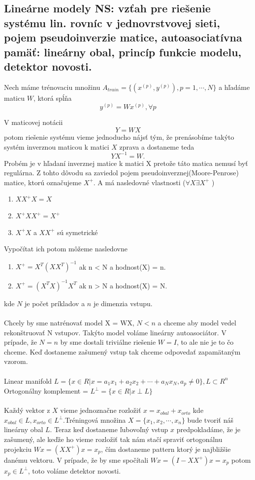 \documentclass{article}
\numberwithin{equation}{section} %
\begin{document}
\subsection{Lineárne modely NS: vzťah pre riešenie systému lin. rovníc v jednovrstvovej sieti, pojem pseudoinverzie matice, autoasociatívna pamäť: lineárny obal, princíp funkcie modelu, detektor novosti.}
Nech máme trénovaciu množinu $A_{train} = \{ (x^{(p)}, y^{(p)}), p=1,\cdots,N \}$ a hľadáme maticu $W$, ktorá spĺňa $$y^{(p)} = Wx^{(p)}, \forall p$$

V maticovej notácii $$Y = WX$$ potom riešenie systému vieme jednoducho nájsť tým, že prenásobíme takýto systém inverznou maticou k matici $X$ zprava a dostaneme teda $$YX^{-1} = W.$$Probém je v hľadaní inverznej matice k matici X pretože táto matica nemusí byť regulárna. Z tohto dôvodu sa zaviedol pojem pseudoinverznej(Moore-Penrose) matice, ktorú označujeme $X^+$. A má nasledovné vlastnosti ($\forall X \exists X^+$ )
\begin{enumerate}
\item $XX^+X = X$
\item $X^+XX^+ = X^+$
\item $X^+X$ a $XX^+$ sú symetrické
\end{enumerate}
Vypočítat ich potom môžeme nasledovne
\begin{enumerate}
\item $X^+ = X^T(XX^T)^{-1}$ ak n < N a hodnost(X) = n.
\item $X^+ = (X^TX)^{-1}X^T$ ak n > N a hodnost(X) = N.
\end{enumerate}
kde $N$ je počet príkladov a $n$ je dimenzia vstupu.
\\\\
Chcely by sme natrénovať model X = WX, $N < n$ a chceme aby model vedel rekonštruovať N vstupov. Takýto model voláme lineárny autoasociátor. V prípade, že $N=n$ by sme dostali triviálne  riešenie $W = I$, to ale nie je to čo chceme. Keď dostaneme zašumený vstup tak chceme odpovedať zapamätaným vzorom. 
\\\\
Linear manifold $L = \{ x \in R | x = a_1x_1 + a_2x_2 + \cdots + a_Nx_N, a_p \neq 0 \} , L \subset R^n$ \\
Ortogonálny komplement = $L^{\perp} = \{x \in R | x \perp L\}$ \\\\
Každý vektor z $X$ vieme jednoznačne rozložiť $ x = x_{obal} + x_{orto}$ kde $x_{obal} \in L, x_{orto} \in L^{\perp}$.Tréningová množina $X = \{ x_1, x_2, \cdots, x_n\}$ bude tvoriť náš lineárny obal $L$. Teraz keď dostaneme ľubovoľný vstup $x$ predpokladáme, že je zašumený, ale keďže ho vieme rozložiť tak nám stačí spraviť ortogonálnu projekciu $Wx = (XX^+)x = x_p$, čím dostaneme pattern ktorý je najbližšie danému vektoru. V prípade, že by sme spočítali $Wx = (I - XX^+)x = x_p$ potom $x_p \in L^{\perp}$, toto voláme detektor novosti.
\end{document}
